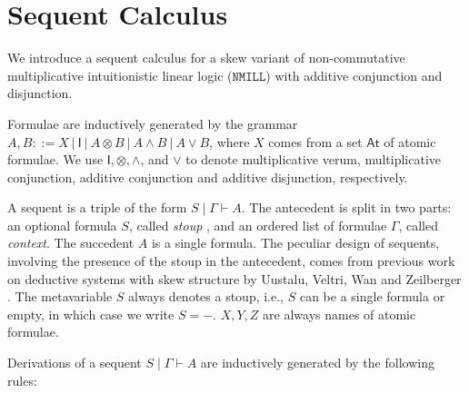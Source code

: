 \documentclass[submission,copyright,creativecommons]{eptcs}
\theoremstyle{definition}
\newcommand{\ot}{\otimes}
\newcommand{\I}{\mathsf{I}}
\newcommand{\NMILL}{$\mathtt{NMILL}$}
\begin{document}
\section{Sequent Calculus}\label{sec:sequent-calculus}
We introduce a sequent calculus for a skew variant of non-commutative multiplicative intuitionistic linear logic (\NMILL) with additive conjunction and disjunction.

Formulae are inductively generated by the grammar $A,B ::= X \ | \ \I \ | \ A \ot B \ | \ A \land B \ | \ A \lor B$, where $X$ comes from a set $\mathsf{At}$ of atomic formulae. 
We use $\I , \ot , \land$, and $\lor$ to denote multiplicative verum, multiplicative conjunction, additive conjunction and additive disjunction, respectively.

A sequent is a triple of the form $S \mid \Gamma \vdash A$.
The antecedent is split in two parts: an optional formula $S$, called \emph{stoup} \cite{girard:constructive:91}, and an ordered list of formulae $\Gamma$, called \emph{context}.
The succedent $A$ is a single formula.
The peculiar design of sequents, involving the presence of the stoup in the antecedent, comes from previous work on deductive systems with skew structure by Uustalu, Veltri, Wan and Zeilberger \cite{uustalu:sequent:2021,uustalu:proof:nodate,uustalu:deductive:nodate,veltri:coherence:2021,UVW:protsn}.
The metavariable $S$ always denotes a stoup, i.e., $S$ can be a single formula or empty, in which case we write $S = {-}$. $X,Y,Z$ are always names of atomic formulae.

Derivations of a sequent $S \mid \Gamma \vdash A$ are inductively generated by the following rules:
\end{document}
